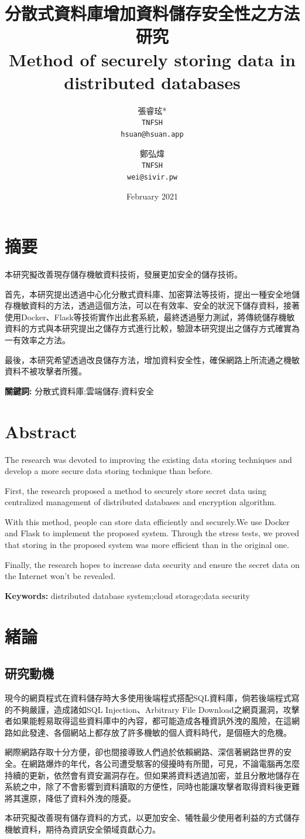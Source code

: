 \documentclass[11pt,twocolumn]{article}
\title{
分散式資料庫增加資料儲存安全性之方法研究\\
Method of securely storing data in distributed databases
}
\author{
  張睿玹*\\
  \texttt{TNFSH}\\
  \texttt{hsuan@hsuan.app}
  \and
  鄭弘煒\\
  \texttt{TNFSH}\\
  \texttt{wei@sivir.pw}
}
\date{February 2021}
\begin{document}
\maketitle
\section*{摘要}
本研究擬改善現存儲存機敏資料技術，發展更加安全的儲存技術。\par
首先，本研究提出透過中心化分散式資料庫、加密算法等技術，提出一種安全地儲存機敏資料的方法，透過這個方法，可以在有效率、安全的狀況下儲存資料，接著使用Docker、Flask等技術實作出此套系統，最終透過壓力測試，將傳統儲存機敏資料的方式與本研究提出之儲存方式進行比較，驗證本研究提出之儲存方式確實為一有效率之方法。\par
最後，本研究希望透過改良儲存方法，增加資料安全性，確保網路上所流通之機敏資料不被攻擊者所獲。

\textbf{關鍵詞:} 分散式資料庫;雲端儲存;資料安全

\section*{Abstract}
The research was devoted to improving the existing data storing techniques and develop a more secure data storing technique than before.\par
First, the research proposed a method to securely store secret data using centralized management of distributed databases and encryption algorithm.\par
With this method, people can store data efficiently and securely.We use Docker and Flask to implement the proposed system. Through the stress tests, we proved that storing in the proposed system was more efficient than in the original one.\par
Finally, the research hopes to increase data security and ensure the secret data on the Internet won't be revealed.

\textbf{Keywords:} distributed database system;cloud storage;data security

\section{緒論}
\subsection{研究動機}
現今的網頁程式在資料儲存時大多使用後端程式搭配SQL資料庫，倘若後端程式寫的不夠嚴謹，造成諸如SQL Injection、Arbitrary File Download之網頁漏洞，攻擊者如果能輕易取得這些資料庫中的內容，都可能造成各種資訊外洩的風險，在這網路如此發達、各個網站上都存放了許多機敏的個人資料時代，是個極大的危機。\par
網際網路存取十分方便，卻也間接導致人們過於依賴網路、深信著網路世界的安全。在網路爆炸的年代，各公司遭受駭客的侵擾時有所聞，可見，不論電腦再怎麼持續的更新，依然會有資安漏洞存在。但如果將資料透過加密，並且分散地儲存在系統之中，除了不會影響到資料讀取的方便性，同時也能讓攻擊者取得資料後更難將其還原，降低了資料外洩的隱憂。\par
本研究擬改善現有儲存資料的方式，以更加安全、犧牲最少使用者利益的方式儲存機敏資料，期待為資訊安全領域貢獻心力。\par
\end{document}
